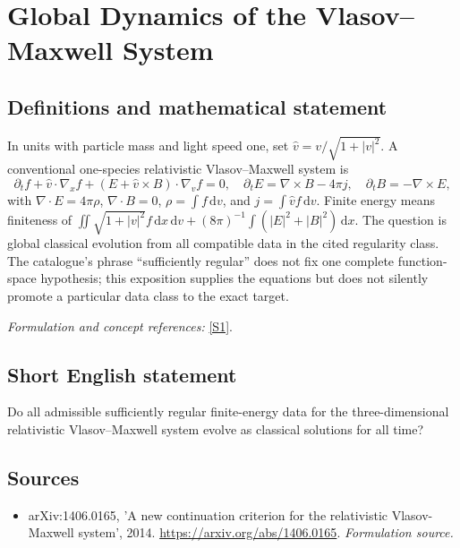 \documentclass[11pt]{article}
\begin{document}
\section*{\texorpdfstring{Global Dynamics of the Vlasov–Maxwell System}{Global Dynamics of the Vlasov–Maxwell System}}\label{30006039}
\subsection{Definitions and mathematical statement}
In units with particle mass and light speed one, set $\widehat v=v/\sqrt{1+|v|^2}$. A conventional one-species relativistic Vlasov--Maxwell system is
\[
 \partial_tf+\widehat v\cdot\nabla_xf+(E+\widehat v\times B)\cdot\nabla_vf=0,
 \quad \partial_tE=\nabla\times B-4\pi j,\quad\partial_tB=-\nabla\times E,
\]
with $\nabla\cdot E=4\pi\rho$, $\nabla\cdot B=0$, $\rho=\int f{\,\mathrm{d}} v$, and $j=\int\widehat v f{\,\mathrm{d}} v$. Finite energy means finiteness of
$\iint\sqrt{1+|v|^2}f{\,\mathrm{d}} x{\,\mathrm{d}} v+(8\pi)^{-1}\int(|E|^2+|B|^2){\,\mathrm{d}} x$.
The question is global classical evolution from all compatible data in the cited regularity class. The catalogue's phrase ``sufficiently regular'' does not fix one complete function-space hypothesis; this exposition supplies the equations but does not silently promote a particular data class to the exact target.
\par\smallskip\textit{Formulation and concept references:} \href{https://arxiv.org/abs/1406.0165}{[S1]}.

\subsection{Short English statement}
Do all admissible sufficiently regular finite-energy data for the three-dimensional relativistic Vlasov–Maxwell system evolve as classical solutions for all time?
\subsection{Sources}
\begin{itemize}
\item[S1]arXiv:1406.0165, 'A new continuation criterion for the relativistic Vlasov-Maxwell system', 2014.
\url{https://arxiv.org/abs/1406.0165}.
\textit{Formulation source.}
\end{itemize}
\end{document}
